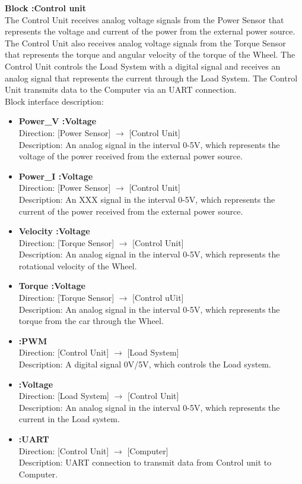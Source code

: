 \textbf{Block :Control unit}\\
The Control Unit receives analog voltage signals from the Power Sensor that represents the voltage and current of the power from the external power source. The Control Unit also receives analog voltage signals from the Torque Sensor that represents the torque and angular velocity of the torque of the Wheel. The Control Unit controls the Load System with a digital signal and receives an analog signal that represents the current through the Load System. The Control Unit transmits data to the Computer via an UART connection.\\
Block interface description:

\begin{itemize}
	\item \textbf{Power\_V :Voltage}\\
		Direction: [Power Sensor] $\rightarrow$ [Control Unit]\\
		Description: An analog signal in the interval 0-5V, which represents the voltage of the power received from the external power source.
	\item \textbf{Power\_I :Voltage}\\
		Direction: [Power Sensor] $\rightarrow$ [Control Unit]\\
		Description: An XXX  signal in the interval 0-5V, which represents the current of the power received from the external power source.
	\item \textbf{Velocity :Voltage}\\
		Direction: [Torque Sensor] $\rightarrow$ [Control Unit]\\
		Description: An analog signal in the interval 0-5V, which represents the rotational velocity of the Wheel.
	\item \textbf{Torque :Voltage}\\
		Direction: [Torque Sensor] $\rightarrow$ [Control uUit]\\
		Description: An analog signal in the interval 0-5V, which represents the torque from the car through the Wheel.
	\item \textbf{:PWM}\\
		Direction: [Control Unit] $\rightarrow$ [Load System]\\
		Description: A digital signal 0V/5V, which controls the Load system.
	\item \textbf{:Voltage}\\
		Direction: [Load System] $\rightarrow$ [Control Unit]\\
		Description: An analog signal in the interval 0-5V, which represents the current in the Load system.
	\item \textbf{:UART}\\
		Direction: [Control Unit] $\rightarrow$ [Computer]\\
		Description: UART connection to transmit data from Control unit to Computer.
\end{itemize}